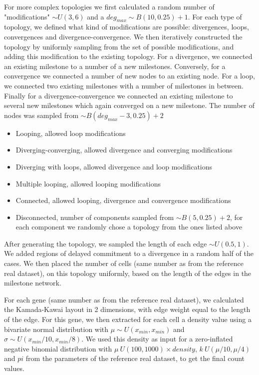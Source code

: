 For more complex topologies we first calculated a random number of "modifications" $\sim U(3, 6)$ and a $\textit{deg}_{\textit{max}} \sim B(10, 0.25) + 1$. For each type of topology, we defined what kind of modifications are possible: divergences, loops, convergences and divergence-convergence. We then iteratively constructed the topology by uniformly sampling from the set of possible modifications, and adding this modification to the existing topology. For a divergence, we connected an existing milestone to a number of a new milestones. Conversely, for a convergence we connected a number of new nodes to an existing node. For a loop, we connected two existing milestones with a number of milestones in between. Finally for a divergence-convergence we connected an existing milestone to several new milestones which again converged on a new milestone. The number of nodes was sampled from $\sim B(\textit{deg}_{\textit{max}} - 3, 0.25) + 2$

\begin{itemize}
	\item Looping, allowed loop modifications
	\item Diverging-converging, allowed divergence and converging modifications
	\item Diverging with loops, allowed divergence and loop modifications
	\item Multiple looping, allowed looping modifications
	\item Connected, allowed looping, divergence and convergence modifications
	\item Disconnected, number of components sampled from $\sim B(5, 0.25) + 2$, for each component we randomly chose a topology from the ones listed above
\end{itemize}

After generating the topology, we sampled the length of each edge $\sim U(0.5, 1)$. We added regions of delayed commitment to a divergence in a random half of the cases. We then placed the number of cells (same number as from the reference real dataset), on this topology uniformly, based on the length of the edges in the milestone network.

For each gene (same number as from the reference real dataset), we calculated the Kamada-Kawai layout in 2 dimensions, with edge weight equal to the length of the edge. For this gene, we then extracted for each cell a density value using a bivariate normal distribution with $\mu \sim U(x_{\textit{min}}, x_{\textit{min}})$ and $\sigma \sim U(x_{\textit{min}}/10, x_{\textit{min}}/8)$. We used this density as input for a zero-inflated negative binomial distribution with $\mu ~ U(100, 1000) \times \textit{density}$, $k ~ U(\mu / 10, \mu / 4)$ and $pi$ from the parameters of the reference real dataset, to get the final count values.

